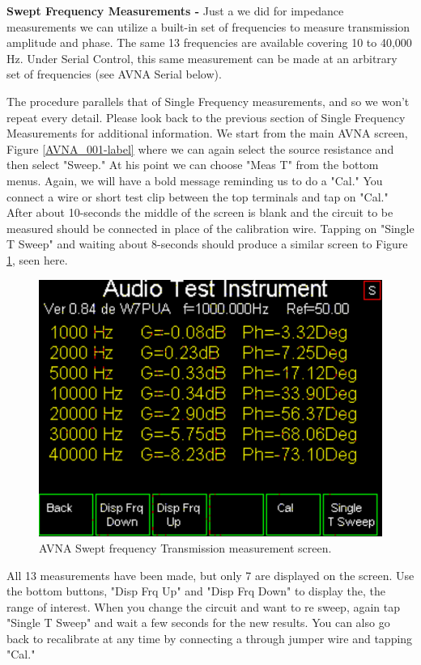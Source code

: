 \textbf{Swept Frequency Measurements - } Just a we did for impedance measurements we can utilize a built-in set of frequencies to measure transmission amplitude and phase.  The same 13 frequencies are available covering 10 to 40,000 Hz.  Under Serial Control, this same measurement can be made at an arbitrary set of frequencies (see AVNA Serial below).

The procedure parallels that of Single Frequency measurements, and so we won't repeat every detail.  Please look back to the previous section of Single Frequency Measurements  for additional information.  We start from the main AVNA screen, Figure \ref{AVNA_001-label} where we can again select the source resistance and then select "Sweep."  At his point we can choose "Meas T" from the bottom menus.  Again, we will have a bold message reminding us to do a "Cal."  You connect a wire or short test clip between the top terminals and tap on "Cal."  After  about 10-seconds the middle of the screen is  blank and the circuit to be measured  should be connected in place of the calibration wire.  Tapping on "Single T Sweep" and waiting about 8-seconds should produce a similar screen to Figure  \ref{AVNA_032-label}, seen here.
\begin{figure}[H]
\begin{center}
\includegraphics[scale=0.75]{./images/AVNA_032.pdf}
\caption{AVNA Swept frequency Transmission measurement screen.}
\label{AVNA_032-label}
\end{center}
\end{figure}
%
All 13 measurements have been made, but only 7 are displayed on the screen.  Use the bottom buttons, "Disp Frq Up" and "Disp Frq Down" to display the, the range of interest.  When you change the circuit and want to re sweep, again tap "Single T Sweep" and wait a few seconds for the new results.  You can also go back to recalibrate at any time by connecting a through jumper wire and tapping "Cal."

